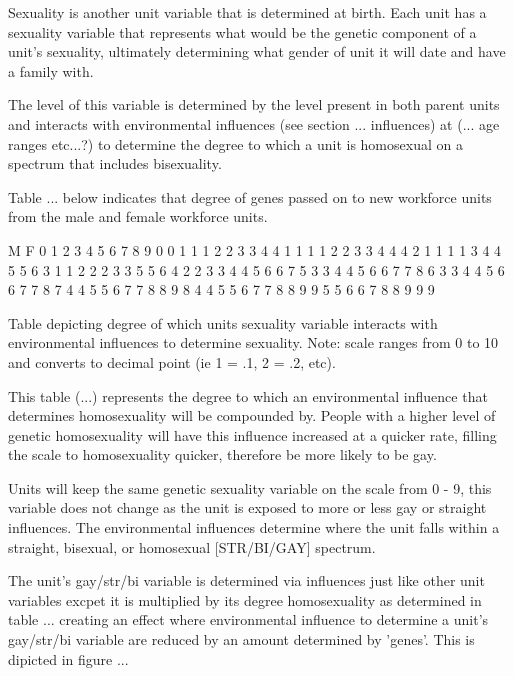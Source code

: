 Sexuality is another unit variable that is determined at birth. Each unit has a sexuality variable that represents what would be the genetic component of a unit's sexuality, ultimately determining what gender of unit it will date and have a family with.

The level of this variable is determined by the level present in both parent units and interacts with environmental influences (see section ... influences) at (... age ranges etc...?) to determine the degree to which a unit is homosexual on a spectrum that includes bisexuality. 

Table ... below indicates that degree of genes passed on to new workforce units from the male and female workforce units.

   M			        
F  0  1  2  3  4  5  6  7  8  9     
0  0  1  1  1  2  2  3  3  4  4
1  1  1  1  2  2  3  3  4  4  4     
2  1  1  1  1  3  4  4  5  5  6     
3  1  1  2  2  2  3  3  5  5  6     
4  2  2  3  3  4  4  5  6  6  7     
5  3  3  4  4  5  6  6  7  7  8     
6  3  3  4  4  5  6  6  7  7  8     
7  4  4  5  5  6  7  7  8  8  9      
8  4  4  5  5  6  7  7  8  8  9       
9  5  5  6  6  7  8  8  9  9  9

Table depicting degree of which units sexuality variable interacts with environmental influences to determine sexuality.
Note: scale ranges from 0 to 10 and converts to decimal point (ie 1 = .1, 2 = .2, etc).


This table (...) represents the degree to which an environmental influence that determines homosexuality will be compounded by. People with a higher level of genetic homosexuality will have this influence increased at a quicker rate, filling the scale to homosexuality quicker, therefore be more likely to be gay.

Units will keep the same genetic sexuality variable on the scale from 0 - 9, this variable does not change as the unit is exposed to more or less gay or straight influences. The environmental influences determine where the unit falls within a straight, bisexual, or homosexual [STR/BI/GAY] spectrum.

The unit's gay/str/bi variable is determined via influences just like other unit variables excpet it is multiplied by its degree homosexuality as determined in table ... creating an effect where environmental influence to determine a unit's gay/str/bi variable are reduced by an amount determined by 'genes'. This is dipicted in figure ...


